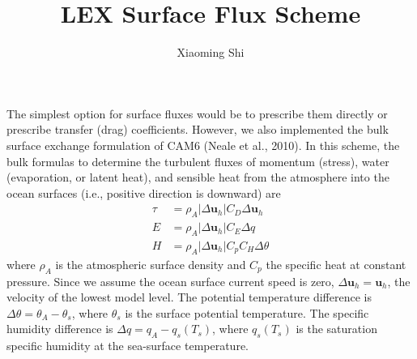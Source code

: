 \documentclass[a4paper,11pt]{article}
\title{\textbf{LEX Surface Flux Scheme}}
\author{Xiaoming Shi}
\begin{document}
\maketitle

The simplest option for surface fluxes would be to prescribe them directly or prescribe transfer (drag) coefficients. However, we also implemented the bulk surface exchange formulation of CAM6 (Neale et al., 2010). In this scheme, the bulk formulas to determine the turbulent fluxes of momentum (stress), water (evaporation, or latent heat), and sensible heat from the atmosphere into the ocean surfaces (i.e., positive direction is downward) are 
\begin{align}
\tau &= \rho_A |\Delta \mathbf{u}_h| C_D\Delta \mathbf{u}_h \\
E &= \rho_A|\Delta \mathbf{u}_h| C_E\Delta q \\
H &= \rho_A|\Delta \mathbf{u}_h|C_p C_H\Delta \theta
\end{align}
where $\rho_A$ is the atmospheric surface density and $C_p$ the specific heat at constant pressure. Since we assume the ocean surface current speed is zero, $\Delta \mathbf{u}_h = \mathbf{u}_h$, the velocity of the lowest model level. The potential temperature difference is $\Delta \theta = \theta_A - \theta_s$, where $\theta_s$ is the surface potential temperature. The specific humidity difference is $\Delta q = q_A - q_s(T_s)$, where $q_s(T_s)$ is the saturation specific humidity at the sea-surface temperature. 
\end{document}
